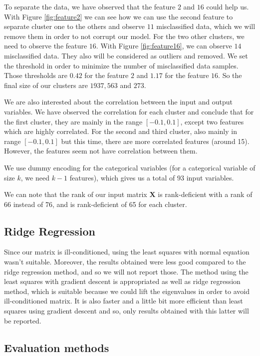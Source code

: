 \documentclass{article} %
\begin{document}
To separate the data, we have observed that the feature $2$ and $16$ could help us. With Figure \ref{fig:feature2} we can see how we can use the second feature to separate cluster one to the others and observe $11$ misclassified data, which we will remove them in order to not corrupt our model. For the two other clusters, we need to observe the feature $16$. With Figure \ref{fig:feature16}, we can observe $14$ misclassified data. They also will be considered as outliers and removed. We set the threshold in order to minimize the number of misclassified data samples. Those thresholds are $0.42$ for the feature $2$ and $1.17$ for the feature $16$. So the final size of our clusters are $1937, 563$ and $273$.

We are also interested about the correlation between the input and output variables. We have observed the correlation for each cluster and conclude that for the first cluster, they are mainly in the range $[-0.1,0.1]$, except two features which are highly correlated. For the second and third cluster, also mainly in range $[-0.1,0.1]$ but this time, there are more correlated features (around 15). However, the features seem not have correlation between them.

We use dummy encoding for the categorical variables (for a categorical variable of size $k$, we need $k-1$ features), which gives us a total of $93$ input variables.

We can note that the rank of our input matrix $\mathbf{X}$ is rank-deficient with a rank of 66 instead of 76, and is rank-deficient of 65 for each cluster.
\vspace{-0.5em}
\subsection{Ridge Regression}

Since our matrix is ill-conditioned, using the least squares with normal equation wasn't suitable. Moreover, the results obtained were less good compared to the ridge regression method, and so we will not report those. The method using the least squares with gradient descent is appropriated as well as ridge regression method, which is suitable because we could lift the eigenvalues in order to avoid ill-conditioned matrix. It is also faster and a little bit more efficient than least squares using gradient descent and so, only results obtained with this latter will be reported.
\vspace{-0.5em}
\subsection{Evaluation methods}
\end{document}
